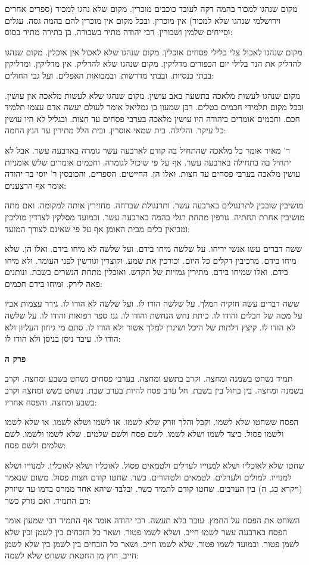 \documentclass[12pt, openany]{book}
\newcommand{\sethebfont}{
\fontsize{10.5pt}{21.0pt} \selectfont
}
\newcommand{\textblock}[1]{
{\sethebfont #1\\}	
}
\newcommand{\sectname}{}
\newcommand{\newsection}[1]{
	\addcontentsline{toc}{section}{#1}
	\renewcommand{\sectname}{#1}	
	\vspace{-\baselineskip}
	\begin{center}
		\textbf{%
\fontsize{16pt}{16pt}\selectfont
			#1}
	\end{center}
	\vspace{-\baselineskip}
	\nopagebreak
}
\begin{document}
\textblock{מקום שנהגו למכור בהמה דקה לעובד כוכבים מוכרין. מקום שלא נהגו למכור ({\small ספרים אחרים וירושלמי}  שנהגו שלא למכור) אין מוכרין. ובכל מקום אין מוכרין להם בהמה גסה. עגלים וסייחים שלמין ושבורין. רבי יהודה מתיר בשבורה. בן בתירה מתיר בסוס:  }
\textblock{מקום שנהגו לאכול צלי בלילי פסחים אוכלין. מקום שנהגו שלא לאכול אין אוכלין. מקום שנהגו להדליק את הנר בלילי יום הכפורים מדליקין. מקום שנהגו שלא להדליק. אין מדליקין. ומדליקין בבתי כנסיות. ובבתי מדרשות. ובמבואות האפלים. ועל גבי החולים:  }
\textblock{מקום שנהגו לעשות מלאכה בתשעה באב עושין. מקום שנהגו שלא לעשות מלאכה אין עושין. ובכל מקום תלמידי חכמים בטלים. רבן שמעון בן גמליאל אומר לעולם יעשה אדם עצמו תלמיד חכם. וחכמים אומרים ביהודה היו עושין מלאכה בערבי פסחים עד חצות. ובגליל לא היו עושין כל עיקר. והלילה. בית שמאי אוסרין. ובית הלל מתירין עד הנץ החמה:  }
\textblock{ר' מאיר אומר כל מלאכה שהתחיל בה קודם לארבעה עשר גומרה בארבעה עשר. אבל לא יתחיל בה בתחילה בארבעה עשר. אף על פי שיכול לגומרה. וחכמים אומרים שלש אומניות עושין מלאכה בערבי פסחים עד חצות. ואלו הן. החייטים. הספרים. והכובסין ר' יוסי בר יהודה אומר אף הרצענים:  }
\textblock{מושיבין שובכין לתרנגולים בארבעה עשר. ותרנגולת שברחה. מחזירין אותה למקומה. ואם מתה מושיבין אחרת תחתיה. גורפין מתחת רגלי בהמה בארבעה עשר. ובמועד מסלקין לצדדין מוליכין ומביאין כלים מבית האומן אף על פי שאינם לצורך המועד:  }
\textblock{ששה דברים עשו אנשי יריחו. על שלשה מיחו בידם. ועל שלשה לא מיחו בידם. ואלו הן. שלא מיחו בידם. מרכיבין דקלים כל היום. וכורכין את שמע. וקוצרין וגודשין לפני העומר. ולא מיחו בידם. ואלו שמיחו בידם. מתירין גמזיות של הקדש. ואוכלין מתחת הנשרים בשבת. ונותנים פאה לירק. ומיחו בידם חכמים:  }
\textblock{ששה דברים עשה חזקיה המלך. על שלשה הודו לו. ועל שלשה לא הודו לו. גירר עצמות אביו על מטה של חבלים והודו לו. כיתת נחש הנחשת והודו לו. גנז ספר רפואות והודו לו. על שלשה לא הודו לו. קיצץ דלתות של היכל ושיגרן למלך אשור ולא הודו לו. סתם מי גיחון העליון ולא הודו לו. עיבר ניסן בניסן ולא הודו לו:  }
\newsection{פרק ה}
\textblock{תמיד נשחט בשמנה ומחצה. וקרב בתשע ומחצה. בערבי פסחים נשחט בשבע ומחצה. וקרב בשמנה ומחצה. בין בחול בין בשבת. חל ערב פסח להיות בערב שבת. נשחט בשש ומחצה וקרב בשבע ומחצה. והפסח אחריו:  }
\textblock{הפסח ששחטו שלא לשמו. וקבל והלך וזרק שלא לשמו. או לשמו ושלא לשמו. או שלא לשמו ולשמו פסול. כיצד לשמו ושלא לשמו. לשם פסח ולשם שלמים. שלא לשמו ולשמו. לשם שלמים ולשם פסח:  }
\textblock{שחטו שלא לאוכליו ושלא למנוייו לערלים ולטמאים פסול. לאוכליו ושלא לאוכליו. למנוייו ושלא למנוייו. למולים ולערלים. לטמאים ולטהורים. כשר. שחטו קודם חצות פסול. משום שנאמר (ויקרא כג, ה) בין הערבים. שחטו קודם לתמיד כשר. ובלבד שיהא אחד ממרס בדמו עד שיזרק דם התמיד. ואם נזרק כשר:  }
\textblock{השוחט את הפסח על החמץ. עובר בלא תעשה. רבי יהודה אומר אף התמיד רבי שמעון אומר הפסח בארבעה עשר לשמו חייב. ושלא לשמו פטור. ושאר כל הזבחים בין לשמן ובין שלא לשמן פטור. ובמועד לשמו פטור. שלא לשמו חייב. ושאר כל הזבחים בין לשמן בין שלא לשמן חייב. חוץ מן החטאת ששחט שלא לשמה:  }
\end{document}
